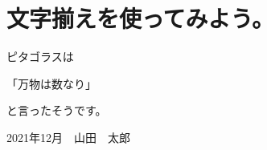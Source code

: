 \documentclass{ltjsarticle}
\begin{document}
\section{文字揃えを使ってみよう。}
ピタゴラスは
\begin{center}
「万物は数なり」
\end{center}
と言ったそうです。

\begin{flushright}
2021年12月　山田　太郎
\end{flushright}
\end{document}
